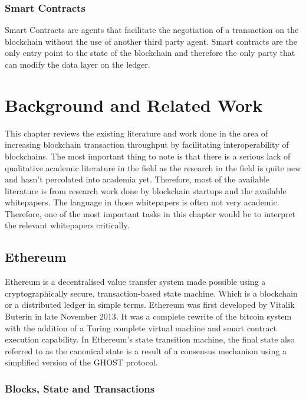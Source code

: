 \documentclass[a4paper,twoside,phd]{BYUPhys}
\begin{document}
\subsection{Smart Contracts}
Smart Contracts are agents that facilitate the negotiation of a transaction on the blockchain without the use of another third party agent. Smart contracts are the only entry point to the state of the blockchain and therefore the only party that can modify the data layer on the ledger.

\chapter{Background and Related Work}
This chapter reviews the existing literature and work done in the area of increasing blockchain transaction throughput by facilitating interoperability of blockchains. The most important thing to note is that there is a serious lack of qualitative academic literature in the field as the research in the field is quite new and hasn't percolated into academia yet. Therefore, most of the available literature is from research work done by blockchain startups and the available whitepapers. The language in those whitepapers is often not very academic. Therefore, one of the most important tasks in this chapter would be to interpret the relevant whitepapers critically.
\section{Ethereum}
Ethereum is a decentralised value transfer system made possible using a cryptographically secure, transaction-based state machine. Which is a blockchain or a distributed ledger in simple terms\cite{}. Ethereum was first developed by Vitalik Buterin in late November 2013\cite{}. It was a complete rewrite of the bitcoin system with the addition of a Turing complete virtual machine and smart contract execution capability. In Ethereum's state transition machine, the final state also referred to as the canonical state is a result of a consensus mechanism using a simplified version of the GHOST protocol\cite{}.

\subsection{Blocks, State and Transactions}
\end{document}
